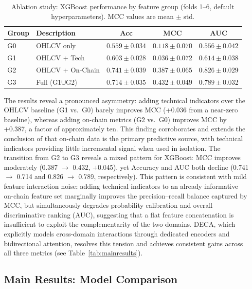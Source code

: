\documentclass[final,3p,times,authoryear]{elsarticle}
\begin{document}
\begin{table}[ht]
\centering
\caption{Ablation study: XGBoost performance by feature group
  (folds 1--6, default hyperparameters). MCC values are mean $\pm$ std.}
\label{tab:ablation}
\small
\begin{tabular}{llccc}
\hline
Group & Description & Acc & MCC & AUC \\
\hline
G0 & OHLCV only        & $0.559\pm0.034$ & $0.118\pm0.070$ & $0.556\pm0.042$ \\
G1 & OHLCV + Tech      & $0.603\pm0.028$ & $0.036\pm0.072$ & $0.614\pm0.038$ \\
G2 & OHLCV + On-Chain  & $0.741\pm0.039$ & $0.387\pm0.065$ & $0.826\pm0.029$ \\
G3 & Full (G1$\cup$G2) & $0.714\pm0.035$ & $0.432\pm0.049$ & $0.789\pm0.032$ \\
\hline
\end{tabular}
\end{table}

The results reveal a pronounced asymmetry: adding technical indicators over
the OHLCV baseline (G1 vs.\ G0) barely improves MCC (+0.036 from a
near-zero baseline), whereas adding on-chain metrics (G2 vs.\ G0)
improves MCC by +0.387, a factor of approximately ten.
This finding corroborates and extends the conclusion of
\citet{omole2025eaai} that on-chain data is the primary predictive
source, with technical indicators providing little incremental signal
when used in isolation.
The transition from G2 to G3 reveals a mixed pattern for XGBoost:
MCC improves moderately (0.387 $\to$ 0.432, $+$0.045), yet Accuracy
and AUC both decline (0.741 $\to$ 0.714 and 0.826 $\to$ 0.789,
respectively).
This pattern is consistent with mild feature interaction noise: adding
technical indicators to an already informative on-chain feature set
marginally improves the precision--recall balance captured by MCC, but
simultaneously degrades probability calibration and overall discriminative
ranking (AUC), suggesting that a flat feature concatenation is
insufficient to exploit the complementarity of the two domains.
DECA, which explicitly models cross-domain interactions through dedicated
encoders and bidirectional attention, resolves this tension and achieves
consistent gains across all three metrics (see Table~\ref{tab:mainresults}).

\subsection{Main Results: Model Comparison}
\label{sec:mainresults}
\end{document}
